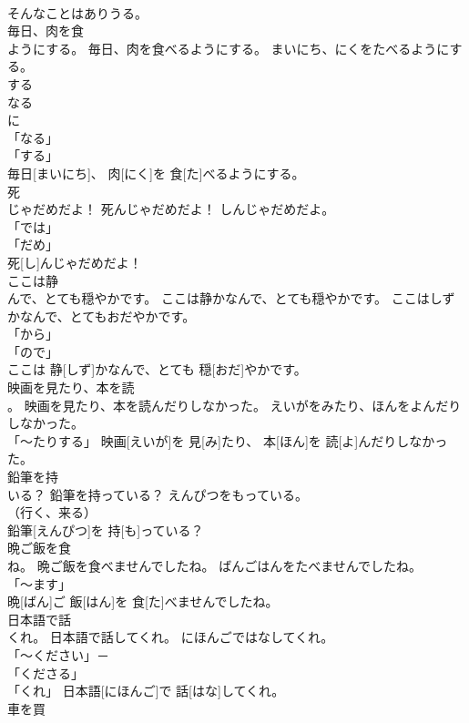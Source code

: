 \documentclass[8pt]{extreport}
\begin{document}
\begin{CJK}{UTF8}{min}
\\	そんなことはありうる。		
\\	毎日、肉を食
\\	ようにする。	毎日、肉を食べるようにする。	まいにち、にくをたべるようにする。	
\\	する 
\\	なる 
\\	に 
\\	「なる」 
\\	「する」 
\\	毎日[まいにち]、 肉[にく]を 食[た]べるようにする。		
\\	死
\\	じゃだめだよ！	死んじゃだめだよ！	しんじゃだめだよ。	
\\	「では」
\\	「だめ」
\\	死[し]んじゃだめだよ！		
\\	ここは静
\\	んで、とても穏やかです。	ここは静かなんで、とても穏やかです。	ここはしずかなんで、とてもおだやかです。	
\\	「から」 
\\	「ので」 
\\	ここは 静[しず]かなんで、とても 穏[おだ]やかです。		
\\	映画を見たり、本を読
\\	。	映画を見たり、本を読んだりしなかった。	えいがをみたり、ほんをよんだりしなかった。	
\\	「～たりする」	映画[えいが]を 見[み]たり、 本[ほん]を 読[よ]んだりしなかった。		
\\	鉛筆を持
\\	いる？	鉛筆を持っている？	えんぴつをもっている。	
\\	（行く、来る） 
\\	鉛筆[えんぴつ]を 持[も]っている？		
\\	晩ご飯を食
\\	ね。	晩ご飯を食べませんでしたね。	ばんごはんをたべませんでしたね。	
\\	「～ます」 
\\	晩[ばん]ご 飯[はん]を 食[た]べませんでしたね。		
\\	日本語で話
\\	くれ。	日本語で話してくれ。	にほんごではなしてくれ。	
\\	「～ください」－ 
\\	「くださる」 
\\	「くれ」	日本語[にほんご]で 話[はな]してくれ。		
\\	車を買

\end{CJK}
\end{document}
